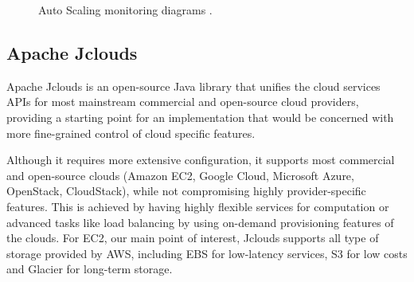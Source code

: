 \begin{figure}[h]
	\centering
	\caption{Auto Scaling monitoring diagrams \cite{CfnProcesses}.}
	\label{CfnScaling}
\end{figure}

\subsection{Apache Jclouds}

Apache Jclouds \cite{jclouds} is an open-source Java library that unifies the cloud services APIs for most mainstream commercial and open-source cloud providers, providing a starting point for an implementation that would be concerned with more fine-grained control of cloud specific features.

Although it requires more extensive configuration, it supports most commercial and open-source clouds (Amazon EC2, Google Cloud, Microsoft Azure, OpenStack, CloudStack), while not compromising highly provider-specific features. This is achieved by having highly flexible services for computation or advanced tasks like load balancing by using on-demand provisioning features of the clouds. For EC2, our main point of interest, Jclouds supports all type of storage provided by AWS, including EBS for low-latency services, S3 for low costs and Glacier for long-term storage.

